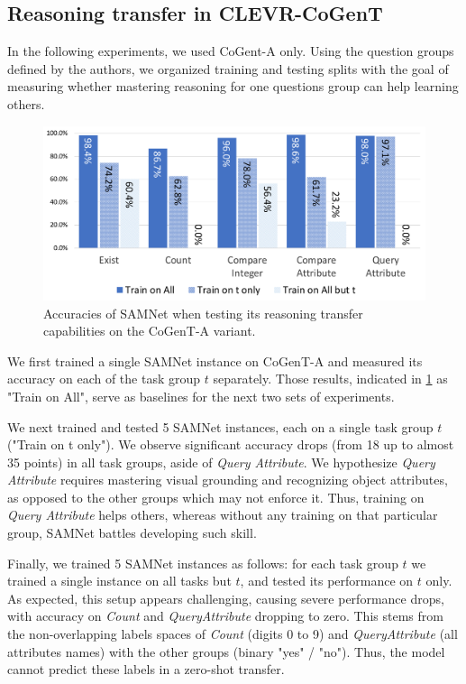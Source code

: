 \subsection{Reasoning transfer in CLEVR-CoGenT}
\label{sec:reasoning-transfer-clevr}
In the following experiments, we used CoGent-A only.
Using the question groups defined by the authors, we organized training and testing splits with the goal of measuring whether mastering reasoning for one questions group can help learning others.

\begin{figure}[htbp]
	\centering
	\includegraphics[width=\columnwidth]{../img/plots/cogent_reasoning_transfer.pdf}
	\caption{Accuracies of SAMNet when testing its reasoning transfer capabilities on the CoGenT-A variant.}
	\label{fig:cogent_reasoning_transfer}
\end{figure}

We first trained a single SAMNet instance on CoGenT-A and measured its accuracy on each of the task group $t$ separately.
Those results, indicated in \cref{fig:cogent_reasoning_transfer} as "Train on All", serve as baselines for the next two sets of experiments.

We next trained and tested 5 SAMNet instances, each on a single task group $t$ ("Train on t only").
We observe significant accuracy drops (from 18 up to almost 35 points) in all task groups, aside of \textit{Query Attribute}.
We hypothesize \textit{Query Attribute} requires mastering visual grounding and recognizing object attributes, as opposed to the other groups which may not enforce it.
Thus, training on \textit{Query Attribute} helps others, whereas without any training on that particular group, SAMNet battles developing such skill.

Finally, we trained 5 SAMNet instances as follows: for each task group $t$ we trained a single instance on all tasks but $t$, and tested its performance on $t$ only.
As expected, this setup appears challenging, causing severe performance drops, with accuracy on \textit{Count} and \textit{QueryAttribute} dropping to zero.
This stems from the non-overlapping labels spaces of \textit{Count} (digits 0 to 9) and \textit{QueryAttribute} (all attributes names) with the other groups (binary "yes" / "no"). Thus, the model cannot predict these labels in a zero-shot transfer.


